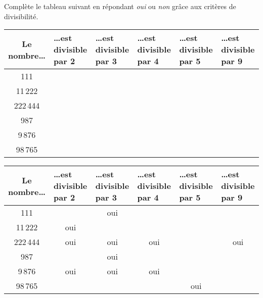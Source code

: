 Complète le tableau suivant en répondant {\em oui} ou {\em non} grâce
aux critères de divisibilité.
\begin{center}
  \begin{tabular}{|c|m{2cm}|m{2cm}|m{2cm}|m{2cm}|m{2cm}|}
    \hline
Le nombre\ldots&\ldots est divisible par 2&\ldots est divisible par
3&\ldots est divisible par 4&\ldots est divisible par 5&\ldots est
divisible par 9\\
\hline
111&&&&&\\
\hline
11\,222&&&&&\\
\hline
222\,444&&&&&\\
\hline
987&&&&&\\
\hline
9\,876&&&&&\\
\hline
98\,765&&&&&\\
\hline
  \end{tabular}
\end{center}
\begin{center}
  \begin{tabular}{|c|m{2cm}|m{2cm}|m{2cm}|m{2cm}|m{2cm}|}
    \hline
Le nombre\ldots&\ldots est divisible par 2&\ldots est divisible par
3&\ldots est divisible par 4&\ldots est divisible par 5&\ldots est
divisible par 9\\
\hline
111&&\multicolumn{1}{c|}{oui}&&&\\
\hline
11\,222&\multicolumn{1}{c|}{oui}&&&&\\
\hline
222\,444&\multicolumn{1}{c|}{oui}&\multicolumn{1}{c|}{oui}&\multicolumn{1}{c|}{oui}&&\multicolumn{1}{c|}{oui}\\
\hline
987&&\multicolumn{1}{c|}{oui}&&&\\
\hline
9\,876&\multicolumn{1}{c|}{oui}&\multicolumn{1}{c|}{oui}&\multicolumn{1}{c|}{oui}&&\\
\hline
98\,765&&&&\multicolumn{1}{c|}{oui}&\\
\hline
  \end{tabular}
\end{center}
